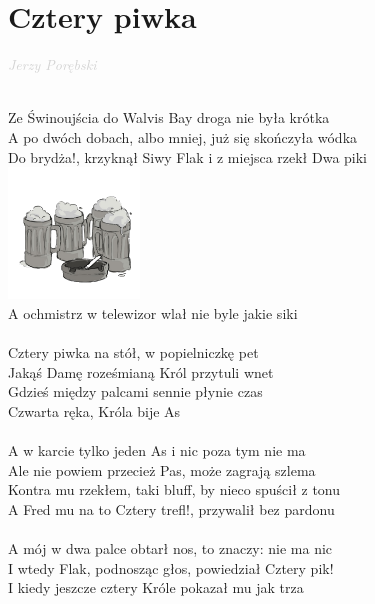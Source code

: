 \documentclass[a5paper, 10pt]{book}
\begin{document}
\section{Cztery piwka}\textcolor{lightgray}{\textit{Jerzy Porębski}}\\~\\
\begin{minipage}[t]{0.85\textwidth}
Ze Świnoujścia do Walvis Bay droga nie była krótka\\
A po dwóch dobach, albo mniej, już się skończyła wódka\\
Do brydża!, krzyknął Siwy Flak i z miejsca rzekł Dwa piki\\
\includegraphics[height=35mm,right]{images/cztery_piwka.png}\vspace*{-36mm}\\
A ochmistrz w telewizor wlał nie byle jakie siki\\
\\
\hspace*{5mm}Cztery piwka na stół, w popielniczkę pet\\
\hspace*{5mm}Jakąś Damę roześmianą Król przytuli wnet\\
\hspace*{5mm}Gdzieś między palcami sennie płynie czas\\
\hspace*{5mm}Czwarta ręka, Króla bije As\\
\\
A w karcie tylko jeden As i nic poza tym nie ma\\
Ale nie powiem przecież Pas, może zagrają szlema\\
Kontra mu rzekłem, taki bluff, by nieco spuścił z tonu\\
A Fred mu na to Cztery trefl!, przywalił bez pardonu\\
\\
A mój w dwa palce obtarł nos, to znaczy: nie ma nic\\
I wtedy Flak, podnosząc głos, powiedział Cztery pik!\\
I kiedy jeszcze cztery Króle pokazał mu jak trza\\

\end{minipage}
\end{document}
